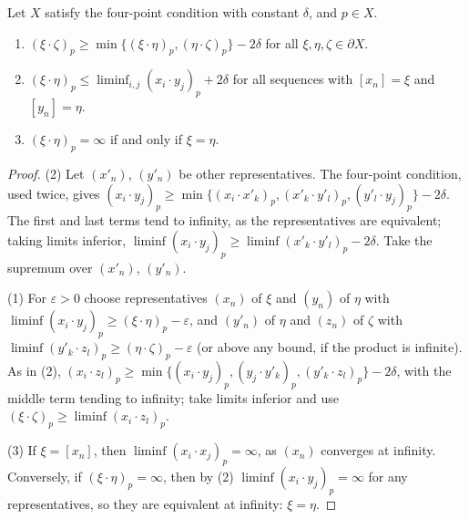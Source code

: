\begin{lemma}
  \label{Metric.GromovBoundary.min_gromovProduct_le}
  Let $X$ satisfy the four-point condition with constant $\delta$, and $p \in X$.
  \begin{enumerate}
    \item $(\xi \cdot \zeta)_p \ge \min\{(\xi \cdot \eta)_p, (\eta \cdot \zeta)_p\} - 2\delta$ for
          all $\xi, \eta, \zeta \in \partial X$.
    \item $(\xi \cdot \eta)_p \le \liminf_{i, j} (x_i \cdot y_j)_p + 2\delta$ for all sequences
          with $[x_n] = \xi$ and $[y_n] = \eta$.
    \item $(\xi \cdot \eta)_p = \infty$ if and only if $\xi = \eta$.
  \end{enumerate}
\end{lemma}
\begin{proof}
  (2) Let $(x'_n)$, $(y'_n)$ be other representatives. The four-point condition, used twice, gives
  $(x_i \cdot y_j)_p \ge \min\{(x_i \cdot x'_k)_p, (x'_k \cdot y'_l)_p, (y'_l \cdot y_j)_p\} -
  2\delta$. The first and last terms tend to infinity, as the representatives are equivalent; taking
  limits inferior, $\liminf (x_i \cdot y_j)_p \ge \liminf (x'_k \cdot y'_l)_p - 2\delta$. Take the
  supremum over $(x'_n)$, $(y'_n)$.

  (1) For $\varepsilon > 0$ choose representatives $(x_n)$ of $\xi$ and $(y_n)$ of $\eta$ with
  $\liminf (x_i \cdot y_j)_p \ge (\xi \cdot \eta)_p - \varepsilon$, and $(y'_n)$ of $\eta$ and
  $(z_n)$ of $\zeta$ with $\liminf (y'_k \cdot z_l)_p \ge (\eta \cdot \zeta)_p - \varepsilon$ (or
  above any bound, if the product is infinite). As in (2), $(x_i \cdot z_l)_p \ge \min\{(x_i \cdot
  y_j)_p, (y_j \cdot y'_k)_p, (y'_k \cdot z_l)_p\} - 2\delta$, with the middle term tending to
  infinity; take limits inferior and use $(\xi \cdot \zeta)_p \ge \liminf (x_i \cdot z_l)_p$.

  (3) If $\xi = [x_n]$, then $\liminf (x_i \cdot x_j)_p = \infty$, as $(x_n)$ converges at
  infinity. Conversely, if $(\xi \cdot \eta)_p = \infty$, then by (2) $\liminf (x_i \cdot y_j)_p =
  \infty$ for any representatives, so they are equivalent at infinity: $\xi = \eta$.
\end{proof}

